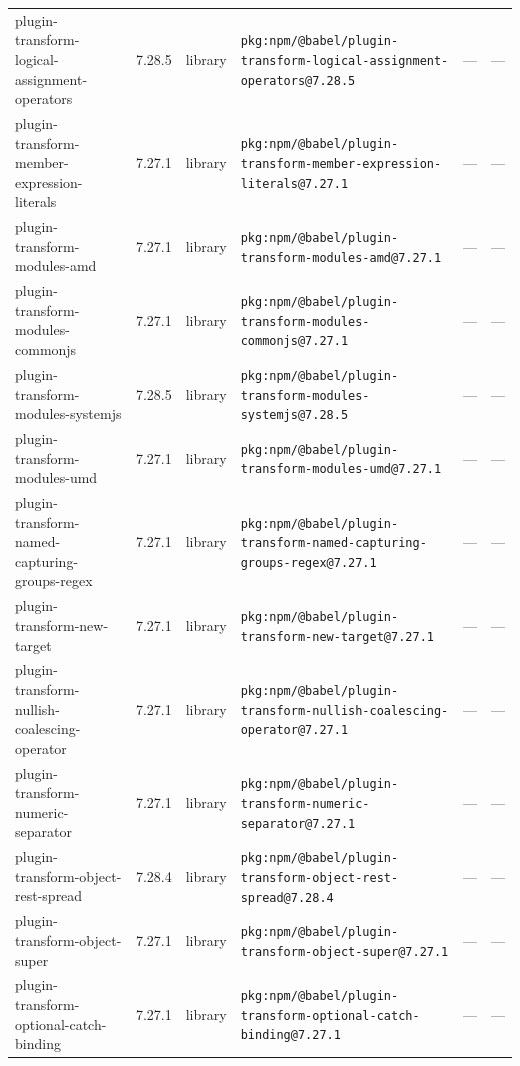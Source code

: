 \documentclass[11pt,a4paper]{article}
\begin{document}
\begin{longtable}{|p{4cm}|p{2cm}|p{1.6cm}|p{5cm}|p{1.5cm}|p{3.5cm}|}
\raggedright plugin-transform-logical-assignment-operators & 7.28.5 & library & \small\texttt{pkg:npm/@babel/plugin-transform-logical-assignment-operators@7.28.5} & — & \small — \\
\raggedright plugin-transform-member-expression-literals & 7.27.1 & library & \small\texttt{pkg:npm/@babel/plugin-transform-member-expression-literals@7.27.1} & — & \small — \\
\raggedright plugin-transform-modules-amd & 7.27.1 & library & \small\texttt{pkg:npm/@babel/plugin-transform-modules-amd@7.27.1} & — & \small — \\
\raggedright plugin-transform-modules-commonjs & 7.27.1 & library & \small\texttt{pkg:npm/@babel/plugin-transform-modules-commonjs@7.27.1} & — & \small — \\
\raggedright plugin-transform-modules-systemjs & 7.28.5 & library & \small\texttt{pkg:npm/@babel/plugin-transform-modules-systemjs@7.28.5} & — & \small — \\
\raggedright plugin-transform-modules-umd & 7.27.1 & library & \small\texttt{pkg:npm/@babel/plugin-transform-modules-umd@7.27.1} & — & \small — \\
\raggedright plugin-transform-named-capturing-groups-regex & 7.27.1 & library & \small\texttt{pkg:npm/@babel/plugin-transform-named-capturing-groups-regex@7.27.1} & — & \small — \\
\raggedright plugin-transform-new-target & 7.27.1 & library & \small\texttt{pkg:npm/@babel/plugin-transform-new-target@7.27.1} & — & \small — \\
\raggedright plugin-transform-nullish-coalescing-operator & 7.27.1 & library & \small\texttt{pkg:npm/@babel/plugin-transform-nullish-coalescing-operator@7.27.1} & — & \small — \\
\raggedright plugin-transform-numeric-separator & 7.27.1 & library & \small\texttt{pkg:npm/@babel/plugin-transform-numeric-separator@7.27.1} & — & \small — \\
\raggedright plugin-transform-object-rest-spread & 7.28.4 & library & \small\texttt{pkg:npm/@babel/plugin-transform-object-rest-spread@7.28.4} & — & \small — \\
\raggedright plugin-transform-object-super & 7.27.1 & library & \small\texttt{pkg:npm/@babel/plugin-transform-object-super@7.27.1} & — & \small — \\
\raggedright plugin-transform-optional-catch-binding & 7.27.1 & library & \small\texttt{pkg:npm/@babel/plugin-transform-optional-catch-binding@7.27.1} & — & \small — \\

\end{longtable}
\end{document}
